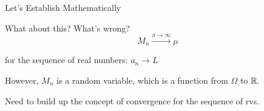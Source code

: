 \begin{frame}{Let's Establish Mathematically}

\plitemsep 0.04in
\bci
\item<2-> What about this? What's wrong?
$$
M_n \xrightarrow{n \rightarrow \infty} \mu
$$

\item<3->  for the sequence of real numbers: $a_n \rightarrow L$



\item<6-> However, $M_n$ is a random variable, which is a function from $\Omega$ to ${\mathbb R}.$

\item<7-> Need to build up the  concept of convergence for the sequence of rvs.

\eci

\end{frame}

